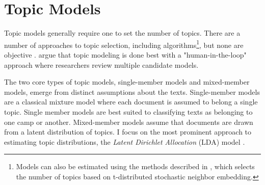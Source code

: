 \documentclass{article}
\begin{document}
\section{Topic Models}


Topic models generally require one to set the number of topics. There are a number of approaches to topic selection, including algorithms\footnote{Models can also be estimated using the methods described in \citet{Lee2014}, which selects the number of topics based on t-distributed stochastic neighbor embedding.}, but none are objective \citep{Roberts2014}. \citet{Chuang2014} argue that topic modeling is done best with a "human-in-the-loop" approach where researchers review multiple candidate models. 


The two core types of topic models, single-member models and mixed-member models, emerge from distinct assumptions about the texts. Single-member models are a classical mixture model where each document is assumed to belong a single topic. Single member models are best suited to classifying texts as belonging to one camp or another. Mixed-member models assume that documents are drawn from a latent distribution of topics\citep{Blei2009}. I focus on the most prominent approach to estimating topic distributions, the \textit{Latent Dirichlet Allocation} (LDA) model \citep{Blei2003}.
\end{document}
